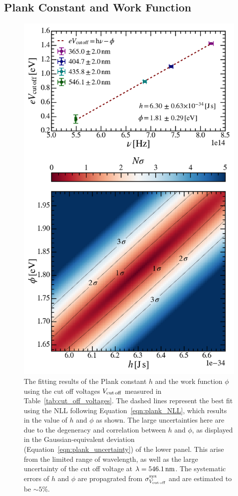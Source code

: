 \documentclass[aps,twocolumn,secnumarabic,balancelastpage,amsmath,amssymb,nofootinbib,floatfix]{revtex4-1}
\newcommand{\nm}{\,{\rm nm}}
\begin{document}
\subsection{Plank Constant and Work Function}
\label{sec:plank_constant}

\begin{figure}
    \centering
    \includegraphics[width=0.49 \textwidth]{Figures/plank_and_work_function_fit.png}
    \caption{The fitting results of the Plank constant $h$ and the work function $\phi$ using the cut off voltages $V_{\rm{cut\,off}}$ measured in Table~\ref{tab:cut_off_voltages}. The dashed lines represent the best fit using the NLL following Equation~\ref{eqn:plank_NLL}, which results in the value of $h$ and $\phi$ as shown. The large uncertainties here are due to the degeneracy and correlation between $h$ and $\phi$, as displayed in the Gaussian-equivalent deviation (Equation~\ref{eqn:plank_uncertainty}) of the lower panel. This arise from the limited range of wavelength, as well as the large uncertainty of the cut off voltage at $\lambda = 546.1\nm$. The systematic errors of $h$ and $\phi$ are propagrated from $\sigma_{V_{\rm{cut\,off}}}^{\rm{sys}}$ and are estimated to be $\sim 5\%$.}
    \label{fig:h_and_phi}
\end{figure}
\end{document}
